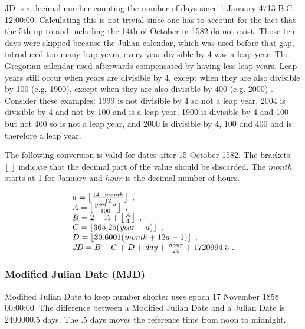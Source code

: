 JD is a decimal number counting the number of days since 1 January 4713
B.C. 12:00:00. Calculating this is not trivial since one has to account
for the fact that the 5th up to and including the 14th of October in
1582 do not exist. Those ten days were skipped because the Julian
calendar, which was used before that gap, introduced too many leap
years, every year divisible by 4 was a leap year. The Gregorian calendar
used afterwards compensated by having less leap years. Leap years still
occur when years are divisible by 4, except when they are also divisible
by 100 (e.g. 1900), except when they are also divisible by 400 (e.g.
2000) \cite{acf:2014aa}. Consider these examples: 1999 is not divisible
by 4 so not a leap year, 2004 is divisible by 4 and not by 100 and is a
leap year, 1900 is divisible by 4 and 100 but not 400 so is not a leap
year, and 2000 is divisible by 4, 100 and 400 and is therefore a leap
year.

The following conversion is valid for dates after 15 October 1582. The
brackets $\left \lfloor \  \right \rfloor$ indicate that the decimal part of the value should
be discarded. The $\mathit{month}$ starts at 1 for January and
$\mathit{hour}$ is the decimal number of hours.

\begin{equation}
    \begin{array}{l}
        a = \left \lfloor \frac{14 - \mathit{month}}{12} \right \rfloor \ , \\
        A = \left \lfloor \frac{\mathit{year - a}}{100} \right \rfloor \ , \\
        B = 2 - A + \left \lfloor \frac{A}{4} \right \rfloor \ , \\
        C = \left \lfloor 365.25 (\mathit{year} - a) \right \rfloor \ , \\
        D = \left \lfloor 30.6001 (\mathit{month} + 12 a + 1) \right \rfloor \ , \\
        \mathit{JD} = B + C + D + \mathit{day} +
                      \frac{\mathit{hour}}{24} + 1720994.5 \ .
    \end{array}
\end{equation}


\subsubsection{Modified Julian Date (MJD)}

Modified Julian Date to keep number shorter uses epoch 17 November 1858
00:00:00. The difference between a Modified Julian Date and a Julian
Date is 2400000.5 days. The .5 days moves the reference time from noon
to midnight.

